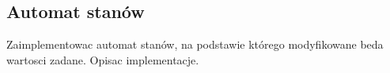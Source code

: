 \subsection{Automat stanów}
\label{lab:zad6}


%    

Zaimplementowac automat stanów, na podstawie którego modyfikowane beda wartosci
zadane. Opisac implementacje.

\newpage
